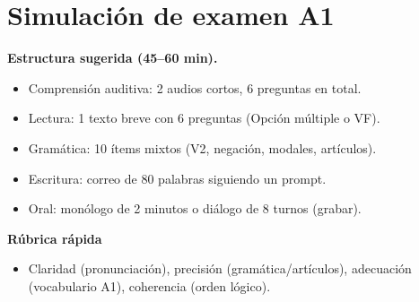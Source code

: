 \section{Simulación de examen A1}
\textbf{Estructura sugerida (45--60 min).}
\begin{itemize}[leftmargin=*]
  \item Comprensión auditiva: 2 audios cortos, 6 preguntas en total.
  \item Lectura: 1 texto breve con 6 preguntas (Opción múltiple o VF).
  \item Gramática: 10 ítems mixtos (V2, negación, modales, artículos).
  \item Escritura: correo de 80 palabras siguiendo un prompt.
  \item Oral: monólogo de 2 minutos o diálogo de 8 turnos (grabar).
\end{itemize}

\textbf{Rúbrica rápida}
\begin{itemize}[leftmargin=*]
  \item Claridad (pronunciación), precisión (gramática/artículos), adecuación (vocabulario A1), coherencia (orden lógico).
\end{itemize}
